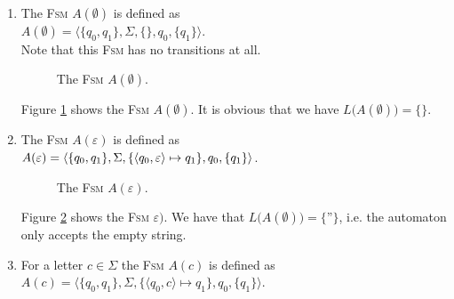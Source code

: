 \begin{enumerate}
\item The \textsc{Fsm} $A(\emptyset)$ is defined as
      \\[0.2cm]
      \hspace*{1.3cm}
      $A(\emptyset) = \langle \{ q_0, q_1 \}, \Sigma, \{\}, q_0, \{ q_1 \} \rangle$.
      \\[0.2cm]
      Note that this \textsc{Fsm} has no transitions at all.

      \begin{figure}[!ht]
        \centering
      \caption{The \textsc{Fsm} $A(\emptyset)$.}
      \label{fig:aLeer.eps}
      \end{figure}
      Figure \ref{fig:aLeer.eps} shows the \textsc{Fsm} $A(\emptyset)$. It is obvious that we have
      $L\bigl(A(\emptyset)\bigr) = \{\}$. 
\item The \textsc{Fsm} $A(\varepsilon)$ is defined as
      \\[0.2cm]
      \hspace*{1.3cm}
      $A(\varepsilon) = \langle \{ q_0, q_1 \}, \Sigma, \{ \pair(q_0, \varepsilon) \mapsto q_1 \}, q_0, \{ q_1 \} \rangle$.


      \begin{figure}[!ht]
        \centering
      \caption{The \textsc{Fsm} $A(\varepsilon)$.}
      \label{fig:aEpsilon.eps}
      \end{figure}
      Figure \ref{fig:aEpsilon.eps} shows the \textsc{Fsm} $\varepsilon)$.
      We have that $L\bigl(A(\emptyset)\bigr) = \{\texttt{''}\}$, i.e. the automaton only accepts the empty string. 
\item For a letter $c \in \Sigma$ the \textsc{Fsm} $A(c)$ is defined as 
      \\[0.2cm]
      \hspace*{1.3cm}
      $A(c) = \langle \{ q_0, q_1 \}, \Sigma, 
                                \{ \langle q_0, c \rangle \mapsto q_1\}, q_0, \{ q_1 \} \rangle$.


\end{enumerate}
